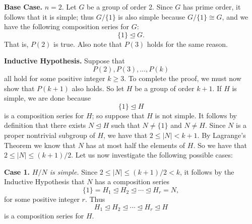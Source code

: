 \documentclass[9pt]{article}
\begin{document}
\begin{enumerate}
      \textbf{Base Case.} $n = 2$. Let $G$ be a group of order 2. Since $G$ has
      prime order, it follows that it is simple; thus $G/\{1\}$ is also simple
      because $G/\{1\} \cong G$, and we have the following composition series
      for $G$:
      $$\{1\} \trianglelefteq G.$$
      That is, $P(2)$ is true. Also note that $P(3)$ holds for the same reason.
      
      \textbf{Inductive Hypothesis.} Suppose that
      $$P(2), P(3), \ldots, P(k)$$
      all hold for some positive integer $k \ge 3$. To complete the proof, we
      must now show that $P(k + 1)$ also holds. So let $H$ be a group of order
      $k + 1$. If $H$ is simple, we are done because
      $$\{1\} \trianglelefteq H$$
      is a composition series for $H$; so suppose that $H$ is not simple. It
      follows by definition that there exists $N \trianglelefteq H$ such that
      $N \neq \{1\}$ and $N \neq H$. Since $N$ is a proper nontrivial subgroup
      of $H$, we have that $2 \le |N| < k + 1$. By Lagrange's Theorem we know
      that $N$ has at most half the elements of $H$. So we have that
      $2 \le |N| \le  (k+1)/2$. Let us now investigate the following possible
      cases:
      
      \textbf{Case 1.} \textit{$H/N$ is simple.} Since
      $2 \le |N| \le  (k+1)/2 < k$, it follows by the Inductive Hypothesis that 
      $N$ has a composition series
      $$\{1\} = H_1 \trianglelefteq H_2 \trianglelefteq \cdots \trianglelefteq
        H_r = N,$$
      for some positive integer $r$. Thus
      $$H_1 \trianglelefteq H_2 \trianglelefteq \cdots \trianglelefteq
        H_r \trianglelefteq H$$
      is a composition series for $H$.
      

\end{enumerate}
\end{document}
